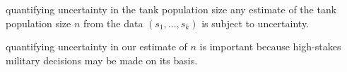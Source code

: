 \documentclass[10pt]{beamer}
\newcommand{\data}{$(s_1, ..., s_k)$\xspace}
\begin{document}
\begin{frame}[t]{quantifying uncertainty in the tank population size}
any estimate of the tank population size $n$ from the data \data is subject to uncertainty.

 
  
quantifying uncertainty in our estimate of $n$ is important because high-stakes military decisions may be made on its basis.
\end{frame}
\end{document}
